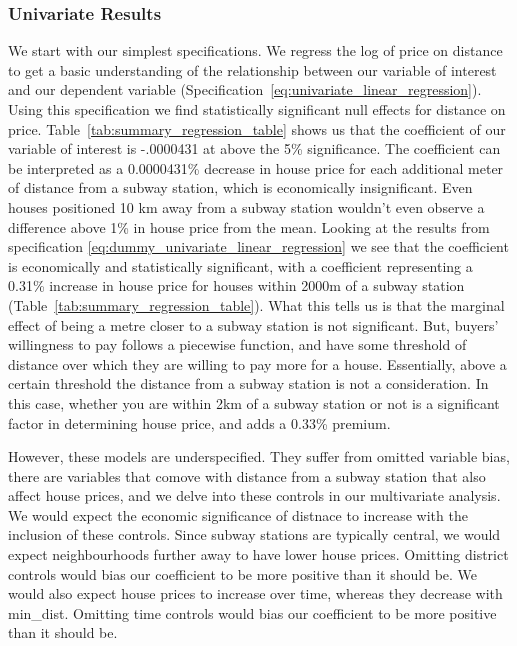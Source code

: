 \subsubsection{Univariate Results}
We start with our simplest specifications. We regress the log of price on distance to get a basic understanding of the 
relationship between our variable of interest and our dependent variable (Specification~\ref{eq:univariate_linear_regression}). 
Using this specification we find statistically significant null effects for distance on price. 
Table~\ref{tab:summary_regression_table} shows us that the coefficient of our variable of interest is -.0000431 at above the 5\% significance.
The coefficient can be interpreted as a 0.0000431\% decrease in house price for each additional meter of distance from a subway station, which is economically insignificant.
 Even houses positioned 10 km away from a subway station wouldn't even observe a difference above 1\% in house price from the mean.
Looking at the results from specification \ref{eq:dummy_univariate_linear_regression} we see that the coefficient is economically and statistically significant,
with a coefficient representing a 0.31\% increase in house price for houses within 2000m of a subway station (Table~\ref{tab:summary_regression_table}).
What this tells us is that the marginal effect of being a metre closer to a subway station is not significant. But, buyers' willingness to pay follows a piecewise function, and have some threshold of distance over which
they are willing to pay more for a house. Essentially, above a certain threshold the distance from a subway station is not a consideration.
In this case, whether you are within 2km of a subway station or not is a significant factor in determining house price, and adds a 0.33\% premium.

However, these models are underspecified. They suffer from omitted variable bias, there are variables that comove with distance from a subway station that also affect house prices, and we delve into these
controls in our multivariate analysis. We would expect the economic significance of distnace to increase with the inclusion of these controls.
Since subway stations are typically central, we would expect neighbourhoods further away to have lower house prices. Omitting 
district controls would bias our coefficient to be more positive than it should be. We would also expect house prices to increase over time, whereas they decrease with min\_dist. Omitting time controls would bias our coefficient to be more 
positive than it should be.

